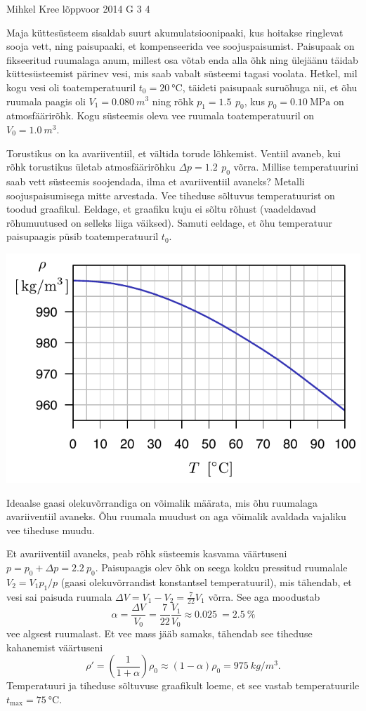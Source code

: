 {Mihkel Kree} %
{lõppvoor} %
{2014} %
{G 3} %
{4} %
{
\ifStatement
Maja küttesüsteem sisaldab suurt akumulatsioonipaaki, kus hoitakse ringlevat sooja vett, ning paisupaaki, et kompenseerida vee soojuspaisumist. Paisupaak on fikseeritud ruumalaga anum, millest osa võtab enda alla õhk ning ülejäänu täidab küttesüsteemist pärinev vesi, mis saab vabalt süsteemi tagasi voolata. Hetkel, mil kogu vesi oli toatemperatuuril $t_0=\SI{20}{\celsius}$, täideti paisupaak suruõhuga nii, et õhu ruumala paagis oli $V_1=\SI{0.080}{m^3}$ ning rõhk $p_1=\SI{1.5}{}\,p_0$, kus $p_0=\SI{0.10}{\mega\pascal}$ on atmosfäärirõhk. Kogu süsteemis oleva vee ruumala toatemperatuuril on $V_0=\SI{1.0}{m^3}$.

Torustikus on ka avariiventiil, et vältida torude lõhkemist. Ventiil avaneb, kui rõhk torustikus ületab atmosfäärirõhku $\Delta p = \SI{1.2}{} \, p_0 $ võrra. Millise temperatuurini saab vett süsteemis soojendada, ilma et avariiventiil avaneks? Metalli soojuspaisumisega mitte arvestada. Vee tiheduse sõltuvus temperatuurist on toodud graafikul. Eeldage, et graafiku kuju ei sõltu rõhust (vaadeldavad rõhumuutused on selleks liiga väiksed). Samuti eeldage, et õhu temperatuur paisupaagis püsib toatemperatuuril $t_0$.

\begin{center}
\includegraphics[width=0.8\linewidth]{2014-v3g-03-veeTihedus}
\end{center}
\fi


\ifHint
Ideaalse gaasi olekuvõrrandiga on võimalik määrata, mis õhu ruumalaga avariiventiil avaneks. Õhu ruumala muudust on aga võimalik avaldada vajaliku vee tiheduse muudu.
\fi


\ifSolution
Et avariiventiil avaneks, peab rõhk süsteemis kasvama väärtuseni $p=p_0+\Delta p = \SI{2.2}{}p_0$. Paisupaagis olev õhk on seega kokku pressitud ruumalale $V_2=V_1 p_1/p$ (gaasi olekuvõrrandist konstantsel temperatuuril), mis tähendab, et vesi sai paisuda ruumala $\Delta V = V_1-V_2 = \frac{7}{22}V_1$ võrra. See aga moodustab \[\alpha = \frac{\Delta V}{V_0}= \frac{7}{22}\frac{V_1}{V_0}\approx \SI{0.025}{} = \SI{2.5}{}\%\] vee algsest ruumalast. Et vee mass jääb samaks, tähendab see tiheduse kahanemist väärtuseni \[\rho'=\left(\frac{1}{1+\alpha}\right)\rho_0\approx(1-\alpha)\rho_0= \SI{975}{kg/m^3}.\]
Temperatuuri ja tiheduse sõltuvuse graafikult loeme, et see vastab temperatuurile $t_\text{max}=\SI{75}{\celsius}$.
\fi


}
